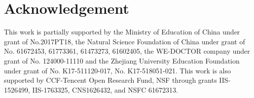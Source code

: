\documentclass[conference]{IEEEtran}
\begin{document}
	\section{Acknowledgement}
	This work is partially supported by the Ministry of Education of China under grant of No.2017PT18, the Natural Science Foundation of China under grant of No. 61672453, 61773361, 61473273, 61602405, the WE-DOCTOR company under grant of No. 124000-11110 and the Zhejiang University Education Foundation under grant of No. K17-511120-017, No. K17-518051-021. This work is also supported by CCF-Tencent Open Research Fund, NSF through grants IIS-1526499, IIS-1763325, CNS1626432, and NSFC 61672313.
	
	
	
	
\end{document}
